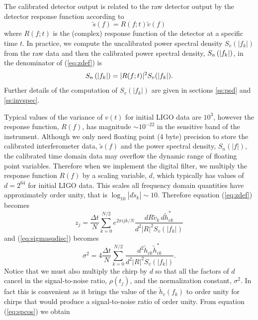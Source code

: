 The calibrated detector output is related to the raw detector output by the
detector response function according to
\begin{equation}
\tilde{s}(f) = R(f;t) \tilde{v}(f)
\end{equation}
where $R(f;t)$ is the (complex) response function of the detector at a
specific time $t$\cite{Adhikari:2003}. In practice, we compute the uncalibrated
power spectral density $S_v(|f_k|)$ from the raw data and then the calibrated
power spectral density, $S_n\left(\left|f_{k}\right|\right)$, in the denominator of (\ref{eq:zdef}) is
\begin{equation}
S_n\left(\left|f_{k}\right|\right) = |R(f;t)|^2 S_v(|f_k|).
\end{equation}
Further details of the computation of $S_v(|f_k|)$ are given in sections
\ref{ss:psd} and \ref{ss:invspec}.

Typical values of the variance of $v(t)$ for initial LIGO data are $10^3$,
however the response function, $R(f)$, has magnitude $\sim 10^{-22}$ in the
sensitive band of the instrument. Although we only need floating point (4
byte) precision to store the calibrated interferometer data, $\tilde{s}(f)$
and the power spectral density, $S_n(|f|)$, the calibrated time domain data may
overflow the dynamic range of floating point variables. Therefore when we
implement the digital filter, we multiply the response function $R(f)$ by a
scaling variable, $d$, which typically has values of $d = 2^{64}$ for initial
LIGO data. This scales all frequency domain quantities have approximately
order unity, that is $\log_{10}|d\tilde{s}_{k}| \sim 10$.  Therefore equation
(\ref{eq:zdef}) becomes
\begin{equation}
\label{eq:zdefcal}
z_j = \frac{\Delta t}{N} \sum_{k=0}^{N/2} e^{2\pi ijk/N} 
  \frac{dR\tilde{v}_k\, d\tilde{h}_{ck}^\ast}
  {d^2|R|^2S_v\left(\left|f_k\right|\right)}
\end{equation}
and (\ref{eq:sigmasqdisc}) becomes
\begin{equation}
\label{eq:sigmasqdisccal}
\sigma^2 = 4 \frac{\Delta t}{N} \sum_{k=0}^{N/2}
\frac{d^2 \tilde{h}_{ck}\tilde{h}_{ck}^\ast}
{d^2|R|^2S_v\left(\left|f_k\right|\right)}. 
\end{equation}
Notice that we must also multiply the chirp by $d$ so that all the factors of
$d$ cancel in the signal-to-noise ratio, $\rho(t_j)$, and the normalization
constant, $\sigma^2$. In fact this is convenient as it brings the value of
the $\tilde{h}_c(f_k)$ to order unity for chirps that would produce a
signal-to-noise ratio of order unity. From equation (\ref{eq:spcos}) we obtain
